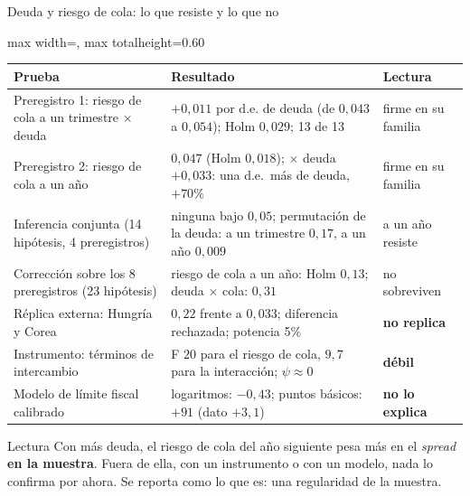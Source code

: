 \documentclass[aspectratio=169]{beamer}
\begin{document}
\begin{frame}{Deuda y riesgo de cola: lo que resiste y lo que no}
\centering
\scriptsize
\begin{adjustbox}{max width=\textwidth, max totalheight=0.60\textheight}
\begin{tabular}{>{\raggedright\arraybackslash}p{}>{\raggedright\arraybackslash}p{}>{\raggedright\arraybackslash}p{}}
\toprule
Prueba & Resultado & Lectura \\
\midrule
Preregistro 1: riesgo de cola a un trimestre $\times$ deuda & $+0{,}011$ por d.e. de deuda (de $0{,}043$ a $0{,}054$); Holm $0{,}029$; 13 de 13 & firme en su familia \\
Preregistro 2: riesgo de cola a un año & $0{,}047$ (Holm $0{,}018$); $\times$ deuda $+0{,}033$: una d.e.\ más de deuda, $+70\%$ & firme en su familia \\
\addlinespace
Inferencia conjunta (14 hipótesis, 4 preregistros) & ninguna bajo $0{,}05$; permutación de la deuda: a un trimestre $0{,}17$, a un año $0{,}009$ & a un año resiste \\
Corrección sobre los 8 preregistros (23 hipótesis) & riesgo de cola a un año: Holm $0{,}13$; deuda $\times$ cola: $0{,}31$ & no sobreviven \\
\addlinespace
Réplica externa: Hungría y Corea & $0{,}22$ frente a $0{,}033$; diferencia rechazada; potencia 5\% & \textbf{no replica} \\
Instrumento: términos de intercambio & F $20$ para el riesgo de cola, $9{,}7$ para la interacción; $\psi\approx0$ & \textbf{débil} \\
Modelo de límite fiscal calibrado & logaritmos: $-0{,}43$; puntos básicos: $+91$ (dato $+3{,}1$) & \textbf{no lo explica} \\
\bottomrule
\end{tabular}
\end{adjustbox}
\vspace{2pt}
\begin{block}{Lectura}
\scriptsize Con más deuda, el riesgo de cola del año siguiente pesa más en el \textit{spread} \textbf{en la muestra}. Fuera de ella, con un instrumento o con un modelo, nada lo confirma por ahora. Se reporta como lo que es: una regularidad de la muestra.
\end{block}
\end{frame}
\end{document}
